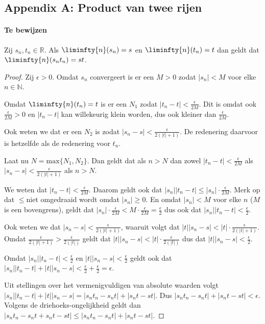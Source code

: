 \subsection{Appendix A: Product van twee rijen}
\label{sec:AA}
\paragraph{Te bewijzen} Zij $s_{n},t_{n}\in\mathbb{R}$. Als $\liminfty{n}(s_{n})=s$ en $\liminfty{n}(t_{n})=t$ dan geldt dat $\liminfty{n}(s_{n}t_{n})=st$.

\begin{proof}
Zij $\epsilon>0$. Omdat $s_{n}$ convergeert is er een $M>0$ zodat $|s_{n}|<M$ voor elke $n\in\mathbb{N}$.\bigskip

\noindent Omdat $\liminfty{n}(t_{n})=t$ is er een $N_{1}$ zodat $|t_{n}-t|<\frac{\epsilon}{2M}$. Dit is omdat ook $\frac{\epsilon}{2M}>0$ en $|t_{n}-t|$ kan willekeurig klein worden, dus ook kleiner dan $\frac{\epsilon}{2M}$. \bigskip

\noindent Ook weten we dat er een $N_{2}$ is zodat $|s_{n}-s|<\frac{\epsilon}{2(|t|+1)}$. De redenering daarvoor is hetzelfde als de redenering voor $t_{n}$. \bigskip

\noindent Laat nu $N=\text{max}\{N_{1},N_{2}\}$. Dan geldt dat als $n>N$ dan zowel $|t_{n}-t|<\frac{\epsilon}{2M}$ als $|s_{n}-s|<\frac{\epsilon}{2(|t|+1)}$ als $n>N$.\bigskip

\noindent We weten dat $|t_{n}-t|<\frac{\epsilon}{2M}$. Daarom geldt ook dat $|s_{n}||t_{n}-t|\leq|s_{n}|\cdot\frac{\epsilon}{2M}$. Merk op dat \bq$\leq$\eq niet omgedraaid wordt omdat $|s_{n}|\geq0$. En omdat $|s_{n}|<M$ voor elke $n$ ($M$ is een bovengrens), geldt dat $|s_{n}|\cdot\frac{\epsilon}{2M}<M\cdot\frac{\epsilon}{2M}=\frac{\epsilon}{2}$ dus ook dat $|s_{n}||t_{n}-t|<\frac{\epsilon}{2}$.\bigskip

\noindent Ook weten we dat $|s_{n}-s|<\frac{\epsilon}{2(|t|+1)}$, waaruit volgt dat $|t||s_{n}-s|<|t|\cdot\frac{\epsilon}{2(|t|+1)}$. Omdat $\frac{\epsilon}{2(|t|+1)}>\frac{\epsilon}{2(|t|)}$ geldt dat $|t||s_{n}-s|<|t|\cdot\frac{\epsilon}{2(|t|)}$ dus dat $|t||s_{n}-s|<\frac{\epsilon}{2}$.\bigskip

\noindent Omdat $|s_{n}||t_{n}-t|<\frac{\epsilon}{2}$ en $|t||s_{n}-s|<\frac{\epsilon}{2}$ geldt ook dat $|s_{n}||t_{n}-t|+|t||s_{n}-s|<\frac{\epsilon}{2}+\frac{\epsilon}{2}=\epsilon$. \bigskip

\noindent Uit stellingen over het vermenigvuldigen van absolute waarden volgt\\ $|s_{n}||t_{n}-t|+|t||s_{n}-s|=|s_{n}t_{n}-s_{n}t|+|s_{n}t-st|$. Dus $|s_{n}t_{n}-s_{n}t|+|s_{n}t-st|<\epsilon$. Volgens de driehoeks-ongelijkheid geldt dan $|s_{n}t_{n}-s_{n}t+s_{n}t-st|\leq|s_{n}t_{n}-s_{n}t|+|s_{n}t-st|$. \bigskip


\end{proof}
